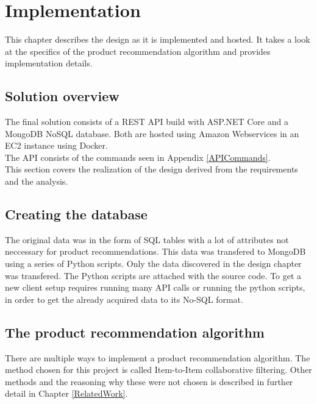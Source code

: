 
\chapter{Implementation} %

\label{Chapter5} %

This chapter describes the design as it is implemented and hosted. It takes a look at the specifics of the product recommendation algorithm and provides implementation details.

\section{Solution overview}

The final solution consists of a \gls{REST} API build with ASP.NET Core and a MongoDB \gls{NoSQL} database. Both are hosted using Amazon Webservices in an EC2 instance using Docker. \\
The API consists of the commands seen in Appendix \ref{APICommands}. \\
This section covers the realization of the design derived from the requirements and the analysis.

\section{Creating the database}
The original data was in the form of SQL tables with a lot of attributes not neccessary for product recommendations. 
This data was transfered to MongoDB using a series of Python scripts. Only the data discovered in the design chapter was transfered. The Python scripts are attached with the source code.
To get a new client setup requires running many API calls or running the python scripts, in order to get the already acquired data to its No-SQL format.

\section{The product recommendation algorithm}
There are multiple ways to implement a product recommendation algorithm. The method chosen for this project is called Item-to-Item collaborative filtering. Other methods and the reasoning why these were not chosen is described in further detail in Chapter \ref{RelatedWork}. \\\\

